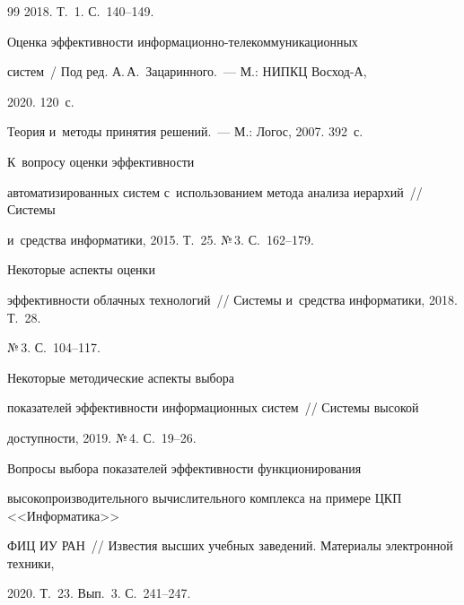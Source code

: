 {{\begin{thebibliography}{99}
2018. Т.~1. С.~140--149. 


   Оценка эффективности ин\-фор\-ма\-ци\-он\-но-те\-ле\-ком\-му\-ни\-ка\-ци\-он\-ных 

  сис\-тем~/ Под ред. А.\,А.~Зацаринного.~--- М.: НИПКЦ Восход-А, 

2020. 120~с.


   Теория и~методы принятия решений.~--- М.: Логос, 2007. 392~с.


   К~вопросу оценки эффективности 

автоматизированных систем с~использованием метода анализа иерархий~/\!\!/ Сис\-те\-мы 

и~средства информатики, 2015. Т.~25. №\,3. С.~162--179.


   Некоторые аспекты оценки 

эффективности облачных технологий~/\!\!/ Сис\-те\-мы и~средства информатики, 2018. Т.~28. 

№\,3. С.~104--117.


   Некоторые методические аспекты выбора 

показателей эффективности информационных сис\-тем~/\!\!/ Сис\-те\-мы высокой 

доступности, 2019. №\,4. С.~19--26.


   Вопросы выбора показателей эффективности функционирования 

высокопроизводительного вычислительного комплекса на примере ЦКП <<Информатика>> 

ФИЦ ИУ РАН~/\!\!/ Известия высших учебных заведений. Материалы электронной техники, 

2020. Т.~23. Вып.~3. С.~241--247.

    \end{thebibliography}

} }








